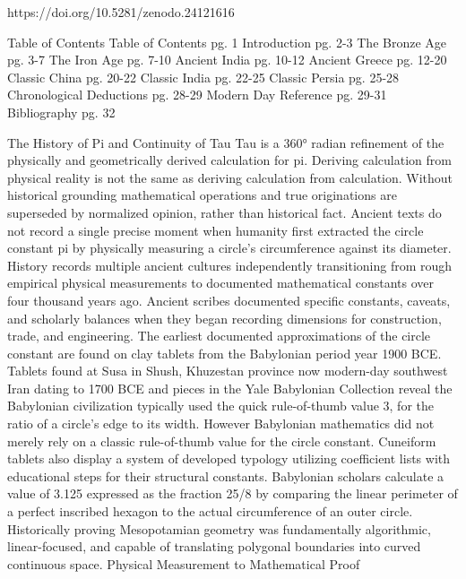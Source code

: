 https://doi.org/10.5281/zenodo.24121616

Table of Contents
Table of Contents pg. 1
Introduction pg. 2-3
The Bronze Age pg. 3-7
The Iron Age pg. 7-10
Ancient India pg. 10-12
Ancient Greece pg. 12-20
Classic China pg. 20-22
Classic India pg. 22-25
Classic Persia pg. 25-28
Chronological Deductions pg. 28-29
Modern Day Reference pg. 29-31
Bibliography pg. 32

The History of Pi and Continuity of Tau
Tau is a 360° radian refinement of the physically and geometrically derived calculation for pi. Deriving calculation from physical reality is not the same as deriving calculation from calculation. Without historical grounding mathematical operations and true originations are superseded by normalized opinion, rather than historical fact. Ancient texts do not record a single precise moment when humanity first extracted the circle constant pi by physically measuring a circle’s circumference against its diameter. History records multiple ancient cultures independently transitioning from rough empirical physical measurements to documented mathematical constants over four thousand years ago. Ancient scribes documented specific constants, caveats, and scholarly balances when they began recording dimensions for construction, trade, and engineering. The earliest documented approximations of the circle constant are found on clay tablets from the Babylonian period year 1900 BCE. 
Tablets found at Susa in Shush, Khuzestan province now modern-day southwest Iran dating to 1700 BCE and pieces in the Yale Babylonian Collection reveal the Babylonian civilization typically used the quick rule-of-thumb value 3, for the ratio of a circle's edge to its width. However Babylonian mathematics did not merely rely on a classic rule-of-thumb value for the circle constant. Cuneiform tablets also display a system of developed typology utilizing coefficient lists with educational steps for their structural constants. Babylonian scholars calculate a value of 3.125 expressed as the fraction 25/8 by comparing the linear perimeter of a perfect inscribed hexagon to the actual circumference of an outer circle. Historically proving Mesopotamian geometry was fundamentally algorithmic, linear-focused, and capable of translating polygonal boundaries into curved continuous space.  
Physical Measurement to Mathematical Proof
